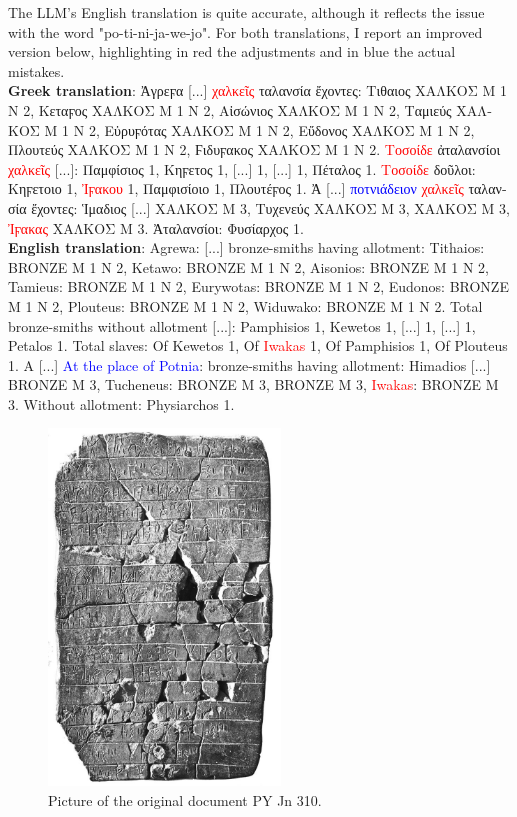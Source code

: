 The LLM's English translation is quite accurate, although it reflects the issue with the word "po-ti-ni-ja-we-jo".
For both translations, I report an improved version below, highlighting in red the adjustments and in blue the actual mistakes. \\
\textbf{Greek translation}: \textgreek{Ἀγρεϝα [...]} \textcolor{red}{\textgreek{χαλκεῖς}} \textgreek{ταλανσία ἔχοντες: Τιθαιος ΧΑΛΚΟΣ M 1 N 2, Κεταϝος ΧΑΛΚΟΣ M 1 N 2, Αἰσώνιος ΧΑΛΚΟΣ M 1 N 2, Ταμιεύς ΧΑΛΚΟΣ M 1 N 2, Εὐρυϝότας ΧΑΛΚΟΣ M 1 N 2, Εὔδονος ΧΑΛΚΟΣ M 1 N 2, Πλουτεύς ΧΑΛΚΟΣ M 1 N 2, Ϝιδυϝακος ΧΑΛΚΟΣ M 1 N 2.} \textcolor{red}{\textgreek{Τοσοίδε}} \textgreek{ἀταλανσίοι} \textcolor{red}{\textgreek{χαλκεῖς}} \textgreek{[...]: Παμφίσιος 1, Κηϝετος 1, [...] 1, [...] 1, Πέταλος 1.} \textcolor{red}{\textgreek{Τοσοίδε}} \textgreek{δοῦλοι: Κηϝετοιο 1,} \textcolor{red}{\textgreek{Ἰϝακου}} \textgreek{1, Παμφισίοιο 1, Πλουτέϝος 1. Ἀ [...]} \textcolor{blue}{\textgreek{ποτνιάδειον}} \textcolor{red}{\textgreek{χαλκεῖς}} \textgreek{ταλανσία ἔχοντες: Ἱμαδιος [...] ΧΑΛΚΟΣ M 3, Τυχενεύς ΧΑΛΚΟΣ M 3, ΧΑΛΚΟΣ M 3,} \textcolor{red}{\textgreek{Ἰϝακας}} \textgreek{ΧΑΛΚΟΣ M 3. Ἀταλανσίοι: Φυσίαρχος 1.} \\
\textbf{English translation}: Agrewa: [...] bronze-smiths having allotment: Tithaios: BRONZE M 1 N 2, Ketawo: BRONZE M 1 N 2, Aisonios: BRONZE M 1 N 2, Tamieus: BRONZE M 1 N 2, Eurywotas: BRONZE M 1 N 2, Eudonos: BRONZE M 1 N 2, Plouteus: BRONZE M 1 N 2, Widuwako: BRONZE M 1 N 2. Total bronze-smiths without allotment [...]: Pamphisios 1, Kewetos 1, [...] 1, [...] 1, Petalos 1. Total slaves: Of Kewetos 1, Of \textcolor{red}{Iwakas} 1, Of Pamphisios 1, Of Plouteus 1. A [...] \textcolor{blue}{At the place of Potnia}: bronze-smiths having allotment: Himadios [...] BRONZE M 3, Tucheneus: BRONZE M 3, BRONZE M 3, \textcolor{red}{Iwakas}: BRONZE M 3. Without allotment: Physiarchos 1.

\begin{figure}[H]
  \centering
  \includegraphics[width=0.55\textwidth]{Images/5057.png} %
  \caption{Picture of the original document PY Jn 310.}
  \label{fig:doc3}
\end{figure}

